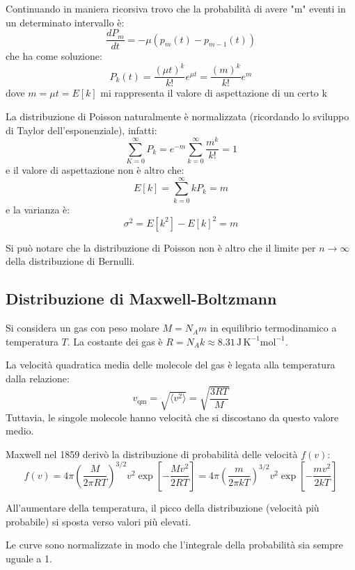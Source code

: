 \documentclass{article}
\begin{document}
Continuando in maniera ricorsiva trovo che la probabilità di avere "m" eventi in un determinato intervallo è:
\[
\frac{dP_m}{dt}=- \mu (p_m(t)-p_{m-1}(t))
\]
che ha come soluzione:
\[
P_k(t)=\frac{(\mu t)^k}{k!}e^{\mu t}=\frac{(m)^k}{k!}e^{m}
\]
dove $m=\mu t=E[k]$ mi rappresenta il valore di aspettazione di un certo k

La distribuzione di Poisson naturalmente è normalizzata (ricordando lo sviluppo di Taylor dell'esponenziale), infatti:
\[
\sum_{K=0}^{\infty}P_k=e^{-m} \sum_{k=0}^{\infty}\frac{m^k}{k!}=1
\]
e il valore di aspettazione non è altro che:
\[
E[k]=\sum_{k=0}^{\infty}k P_k = m 
\]
e la varianza è:
\[
{\sigma^2}=E[k^2]-{E[k]}^2=m
\]

Si può notare che la distribuzione di Poisson non è altro che il limite per $n \rightarrow \infty$ della distribuzione di Bernulli.


\subsection{Distribuzione di Maxwell-Boltzmann}

Si considera un gas con peso molare \( M = N_A m \) in equilibrio termodinamico a temperatura \( T \). La costante dei gas è \( R = N_A k \approx 8.31 \, \text{J} \, \text{K}^{-1} \text{mol}^{-1} \).

La velocità quadratica media delle molecole del gas è legata alla temperatura dalla relazione:
    \[
    v_{\text{qm}} = \sqrt{\langle v^2 \rangle} = \sqrt{\frac{3RT}{M}}
    \]
    Tuttavia, le singole molecole hanno velocità che si discostano da questo valore medio.

Maxwell nel 1859 derivò la distribuzione di probabilità delle velocità \( f(v) \):
    \[
    f(v) = 4\pi \left( \frac{M}{2\pi RT} \right)^{3/2} v^2 \exp \left[ -\frac{Mv^2}{2RT} \right] = 4\pi \left( \frac{m}{2\pi kT} \right)^{3/2} v^2 \exp \left[ -\frac{mv^2}{2kT} \right]
    \]

    All'aumentare della temperatura, il picco della distribuzione (velocità più probabile) si sposta verso valori più elevati.

Le curve sono normalizzate in modo che l'integrale della probabilità sia sempre uguale a 1.
\end{document}
